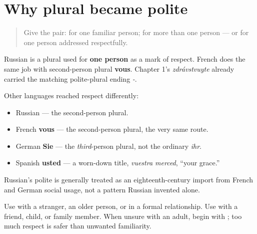 \section[\texorpdfstring{\ru{вы} as polite \textquotedblleft{}you\textquotedblright{} (vy)}{вы as polite \textquotedblleft{}you\textquotedblright{} (vy)}]{Why plural \emph{} became polite}

\label{lesson:RU-C02-vy-formality}



\begin{quote}
Give the pair: \emph{} for one familiar person; \emph{} for more than one person — or for one person addressed respectfully.
\end{quote}

\begin{grammarlens}[title={Grammar Lens: one social job, several grammatical routes}]
Russian \textbf{} is a plural used for \textbf{one person} as a mark of respect. French does the same job with second-person plural \textbf{vous}. Chapter 1's \emph{zdrávstvuyte} already carried the matching polite-plural ending \emph{-}.

Other languages reached respect differently:

\begin{itemize}
\raggedright
  \item Russian \textbf{} — the second-person plural.
  \item French \textbf{vous} — the second-person plural, the very same route.
  \item German \textbf{Sie} — the \emph{third}-person plural, not the ordinary \emph{ihr}.
  \item Spanish \textbf{usted} — a worn-down title, \emph{vuestra merced}, \textquotedblleft{}your grace.\textquotedblright{}
\end{itemize}

Russian's polite \emph{} is generally treated as an eighteenth-century import from French and German social usage, not a pattern Russian invented alone.
\end{grammarlens}

\begin{culture}
Use \emph{} with a stranger, an older person, or in a formal relationship. Use \emph{} with a friend, child, or family member. When unsure with an adult, begin with \textbf{}; too much respect is safer than unwanted familiarity.
\end{culture}

